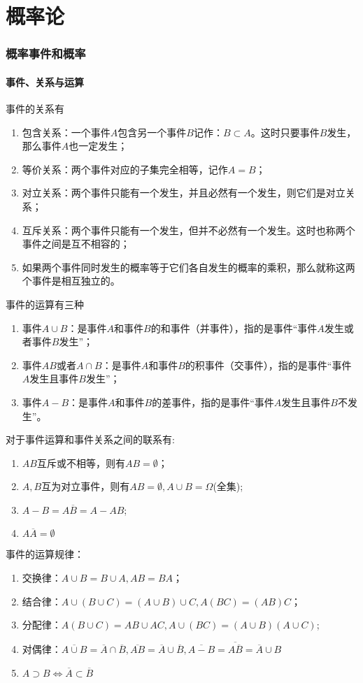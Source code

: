 \part{概率论}
\section{概率事件和概率}
\subsection{事件、关系与运算}
事件的关系有
\begin{enumerate}[(1)]
    \item 包含关系：一个事件$A$包含另一个事件$B$记作：$B\subset A$。这时只要事件$B$发生，那么事件$A$也一定发生；
    \item 等价关系：两个事件对应的子集完全相等，记作$A=B$；
    \item 对立关系：两个事件只能有一个发生，并且必然有一个发生，则它们是对立关系；
    \item 互斥关系：两个事件只能有一个发生，但并不必然有一个发生。这时也称两个事件之间是互不相容的；
    \item 如果两个事件同时发生的概率等于它们各自发生的概率的乘积，那么就称这两个事件是相互独立的。
\end{enumerate}

事件的运算有三种
\begin{enumerate}[(1)]
    \item 事件$A\cup B$：是事件$A$和事件$B$的和事件（并事件），指的是事件“事件$A$发生或者事件$B$发生”；
    \item 事件$AB$或者$A\cap B$：是事件$A$和事件$B$的积事件（交事件），指的是事件“事件$A$发生且事件$B$发生”；
    \item 事件$A-B$：是事件$A$和事件$B$的差事件，指的是事件“事件$A$发生且事件$B$不发生”。
\end{enumerate}

对于事件运算和事件关系之间的联系有:
\begin{enumerate}[(1)]
    \item $AB$互斥或不相等，则有$AB=\emptyset$；
    \item $A,B$互为对立事件，则有$AB=\emptyset, A\cup B=\Omega$(全集);
    \item $A-B = A\overline{B} = A-AB$;
    \item $A\overline{A}=\emptyset$
\end{enumerate}

事件的运算规律：
\begin{enumerate}[(1)]
    \item 交换律：$A\cup B = B\cup A, AB = BA$；
    \item 结合律：$A\cup(B\cup C) = (A\cup B)\cup C,A(BC) = (AB)C$；
    \item 分配律：$A(B\cup C) = AB\cup AC, A\cup(BC) = (A\cup B)(A\cup C)$;
    \item 对偶律：$\overline{A\cup B} = \overline{A}\cap \overline{B}, \overline{AB}=\overline{A}\cup\overline{B},\overline{A-B}=\overline{A\overline{B}}=\overline{A}\cup B$
    \item $A\supset B \iff \overline{A}\subset \overline{B}$
\end{enumerate}


